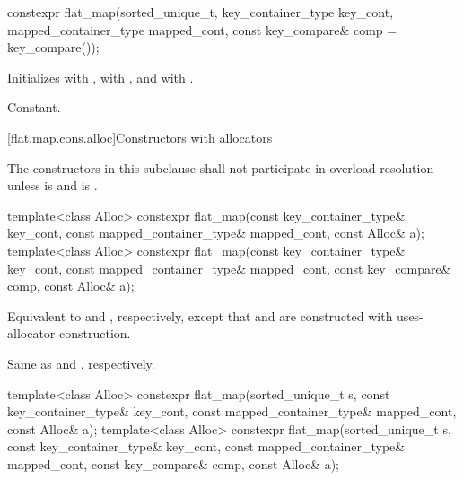 %
\begin{itemdecl}
constexpr flat_map(sorted_unique_t, key_container_type key_cont, mapped_container_type mapped_cont,
                   const key_compare& comp = key_compare());
\end{itemdecl}

\begin{itemdescr}
\pnum
\effects
Initializes
 with ,
 with , and
 with .

\pnum
\complexity
Constant.
\end{itemdescr}

[flat.map.cons.alloc]{Constructors with allocators}

\pnum
The constructors in this subclause shall not participate in overload resolution
unless  is 
and  is .

%
\begin{itemdecl}
template<class Alloc>
  constexpr flat_map(const key_container_type& key_cont, const mapped_container_type& mapped_cont,
                     const Alloc& a);
template<class Alloc>
  constexpr flat_map(const key_container_type& key_cont, const mapped_container_type& mapped_cont,
                     const key_compare& comp, const Alloc& a);
\end{itemdecl}

\begin{itemdescr}
\pnum
\effects
Equivalent to  and
, respectively,
except that  and  are constructed with
uses-allocator construction.

\pnum
\complexity
Same as  and
, respectively.
\end{itemdescr}

%
\begin{itemdecl}
template<class Alloc>
  constexpr flat_map(sorted_unique_t s, const key_container_type& key_cont,
                     const mapped_container_type& mapped_cont, const Alloc& a);
template<class Alloc>
  constexpr flat_map(sorted_unique_t s, const key_container_type& key_cont,
                     const mapped_container_type& mapped_cont, const key_compare& comp,
                     const Alloc& a);
\end{itemdecl}

